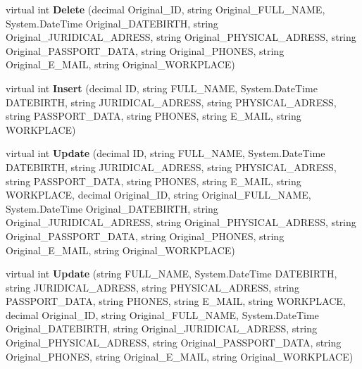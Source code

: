 \begin{CompactItemize}
\item 
virtual int \textbf{Delete} (decimal Original\_\-ID, string Original\_\-FULL\_\-NAME, System.DateTime Original\_\-DATEBIRTH, string Original\_\-JURIDICAL\_\-ADRESS, string Original\_\-PHYSICAL\_\-ADRESS, string Original\_\-PASSPORT\_\-DATA, string Original\_\-PHONES, string Original\_\-E\_\-MAIL, string Original\_\-WORKPLACE)\label{class_automatic_medical_system_1_1_data_set2_table_adapters_1_1_p_a_t_i_e_n_t_s_table_adapter_64849489242009dd5cd77d3858ecbf3f}

\item 
virtual int \textbf{Insert} (decimal ID, string FULL\_\-NAME, System.DateTime DATEBIRTH, string JURIDICAL\_\-ADRESS, string PHYSICAL\_\-ADRESS, string PASSPORT\_\-DATA, string PHONES, string E\_\-MAIL, string WORKPLACE)\label{class_automatic_medical_system_1_1_data_set2_table_adapters_1_1_p_a_t_i_e_n_t_s_table_adapter_77bae04a0a9301c6f4215a883feb9218}

\item 
virtual int \textbf{Update} (decimal ID, string FULL\_\-NAME, System.DateTime DATEBIRTH, string JURIDICAL\_\-ADRESS, string PHYSICAL\_\-ADRESS, string PASSPORT\_\-DATA, string PHONES, string E\_\-MAIL, string WORKPLACE, decimal Original\_\-ID, string Original\_\-FULL\_\-NAME, System.DateTime Original\_\-DATEBIRTH, string Original\_\-JURIDICAL\_\-ADRESS, string Original\_\-PHYSICAL\_\-ADRESS, string Original\_\-PASSPORT\_\-DATA, string Original\_\-PHONES, string Original\_\-E\_\-MAIL, string Original\_\-WORKPLACE)\label{class_automatic_medical_system_1_1_data_set2_table_adapters_1_1_p_a_t_i_e_n_t_s_table_adapter_2d1b11b52829034addc5871cef9d36be}

\item 
virtual int \textbf{Update} (string FULL\_\-NAME, System.DateTime DATEBIRTH, string JURIDICAL\_\-ADRESS, string PHYSICAL\_\-ADRESS, string PASSPORT\_\-DATA, string PHONES, string E\_\-MAIL, string WORKPLACE, decimal Original\_\-ID, string Original\_\-FULL\_\-NAME, System.DateTime Original\_\-DATEBIRTH, string Original\_\-JURIDICAL\_\-ADRESS, string Original\_\-PHYSICAL\_\-ADRESS, string Original\_\-PASSPORT\_\-DATA, string Original\_\-PHONES, string Original\_\-E\_\-MAIL, string Original\_\-WORKPLACE)\label{class_automatic_medical_system_1_1_data_set2_table_adapters_1_1_p_a_t_i_e_n_t_s_table_adapter_d0250bc8643a9ad7cd765c49acb36493}

\end{CompactItemize}
